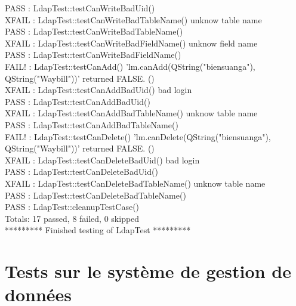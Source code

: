 \documentclass[11pt,fleqn]{report}
\begin{document}
PASS   : LdapTest::testCanWriteBadUid()\\
XFAIL  : LdapTest::testCanWriteBadTableName() unknow table name\\
PASS   : LdapTest::testCanWriteBadTableName()\\
XFAIL  : LdapTest::testCanWriteBadFieldName() unknow field name\\
PASS   : LdapTest::testCanWriteBadFieldName()\\
FAIL!  : LdapTest::testCanAdd() 'lm.canAdd(QString("biensuanga"), QString("Waybill"))' returned FALSE. ()\\
XFAIL  : LdapTest::testCanAddBadUid() bad login\\
PASS   : LdapTest::testCanAddBadUid()\\
XFAIL  : LdapTest::testCanAddBadTableName() unknow table name\\
PASS   : LdapTest::testCanAddBadTableName()\\
FAIL!  : LdapTest::testCanDelete() 'lm.canDelete(QString("biensuanga"), QString("Waybill"))' returned FALSE. ()\\
XFAIL  : LdapTest::testCanDeleteBadUid() bad login\\
PASS   : LdapTest::testCanDeleteBadUid()\\
XFAIL  : LdapTest::testCanDeleteBadTableName() unknow table name\\
PASS   : LdapTest::testCanDeleteBadTableName()\\
PASS   : LdapTest::cleanupTestCase()\\
Totals: 17 passed, 8 failed, 0 skipped\\
********* Finished testing of LdapTest *********\\

\chapter{Tests sur le système de gestion de données}
\end{document}
